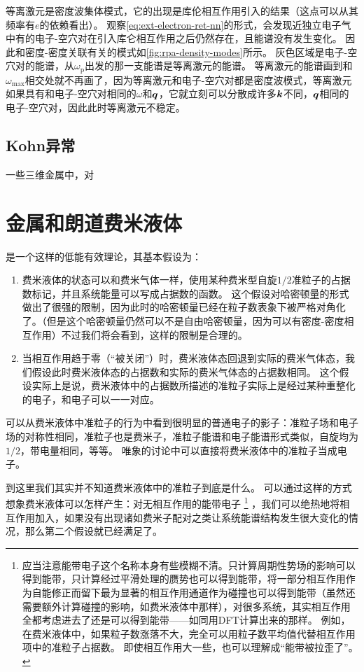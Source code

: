 等离激元是密度波集体模式，它的出现是库伦相互作用引入的结果（这点可以从其频率有$e$的依赖看出）。
观察\eqref{eq:ext-electron-ret-nn}的形式，会发现近独立电子气中有的电子-空穴对在引入库仑相互作用之后仍然存在，且能谱没有发生变化。
因此和密度-密度关联有关的模式如\autoref{fig:rpa-density-modes}所示。
灰色区域是电子-空穴对的能谱，从$\omega_\text{p}$出发的那一支能谱是等离激元的能谱。
等离激元的能谱画到和$\omega_\text{max}$相交处就不再画了，因为等离激元和电子-空穴对都是密度波模式，等离激元如果具有和电子-空穴对相同的$\omega$和$\vb*{q}$，它就立刻可以分散成许多$\vb*{k}$不同，$\vb*{q}$相同的电子-空穴对，因此此时等离激元不稳定。

\subsection{Kohn异常}

一些三维金属中，对

\section{金属和朗道费米液体}\label{sec:landau-fermi-liquid}

是一个这样的低能有效理论，其基本假设为：
\begin{enumerate}
    \item 费米液体的状态可以和费米气体一样，使用某种费米型自旋$1/2$准粒子的占据数标记，并且系统能量可以写成占据数的函数。
    这个假设对哈密顿量的形式做出了很强的限制，因为此时的哈密顿量已经在粒子数表象下被严格对角化了。（但是这个哈密顿量仍然可以不是自由哈密顿量，因为可以有密度-密度相互作用）不过我们将会看到，这样的限制是合理的。
    \item 当相互作用趋于零（“被关闭”）时，费米液体态回退到实际的费米气体态，我们假设此时费米液体态的占据数和实际的费米气体态的占据数相同。
    这个假设实际上是说，费米液体中的占据数所描述的准粒子实际上是经过某种重整化的电子，和电子可以一一对应。
\end{enumerate}

可以从费米液体中准粒子的行为中看到很明显的普通电子的影子：准粒子场和电子场的对称性相同，准粒子也是费米子，准粒子能谱和电子能谱形式类似，自旋均为$1/2$，带电量相同，等等。
唯象的讨论中可以直接将费米液体中的准粒子当成电子。

到这里我们其实并不知道费米液体中的准粒子到底是什么。
可以通过这样的方式想象费米液体可以怎样产生：对无相互作用的能带电子%
\footnote{
    应当注意能带电子这个名称本身有些模糊不清。只计算周期性势场的影响可以得到能带，只计算经过平滑处理的赝势也可以得到能带，将一部分相互作用作为自能修正而留下最为显著的相互作用通道作为碰撞也可以得到能带（虽然还需要额外计算碰撞的影响，如费米液体中那样），对很多系统，其实相互作用全都考虑进去了还是可以得到能带——如同用DFT计算出来的那样。
    例如，在费米液体中，如果粒子数涨落不大，完全可以用粒子数平均值代替相互作用项中的准粒子占据数。
    即使相互作用大一些，也可以理解成“能带被拉歪了”。
}%
，我们可以绝热地将相互作用加入，如果没有出现诸如费米子配对之类让系统能谱结构发生很大变化的情况，那么第二个假设就已经满足了。

